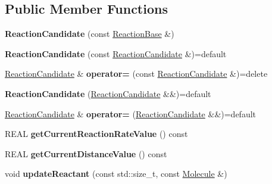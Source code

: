 \subsection*{Public Member Functions}
\begin{DoxyCompactItemize}
\item 
\mbox{\label{classReactionCandidate_a354fb7dab7c9d6f8587a461af02a7cab}} 
{\bfseries Reaction\+Candidate} (const \mbox{\hyperlink{classReactionBase}{Reaction\+Base}} \&)
\item 
\mbox{\label{classReactionCandidate_ab8ef2e26cd357558bc3f1da8678fa287}} 
{\bfseries Reaction\+Candidate} (const \mbox{\hyperlink{classReactionCandidate}{Reaction\+Candidate}} \&)=default
\item 
\mbox{\label{classReactionCandidate_aa09fe4ee2be07ed048558923200d0d6b}} 
\mbox{\hyperlink{classReactionCandidate}{Reaction\+Candidate}} \& {\bfseries operator=} (const \mbox{\hyperlink{classReactionCandidate}{Reaction\+Candidate}} \&)=delete
\item 
\mbox{\label{classReactionCandidate_aaa9808f8a1e2317a8ecafdba3595754c}} 
{\bfseries Reaction\+Candidate} (\mbox{\hyperlink{classReactionCandidate}{Reaction\+Candidate}} \&\&)=default
\item 
\mbox{\label{classReactionCandidate_afc2a6b341b33532357d3fe6cf377b603}} 
\mbox{\hyperlink{classReactionCandidate}{Reaction\+Candidate}} \& {\bfseries operator=} (\mbox{\hyperlink{classReactionCandidate}{Reaction\+Candidate}} \&\&)=default
\item 
\mbox{\label{classReactionCandidate_a62a059b5040f22b857dfeb267bb91d6a}} 
R\+E\+AL {\bfseries get\+Current\+Reaction\+Rate\+Value} () const
\item 
\mbox{\label{classReactionCandidate_a6b563ebd5094f392d1f777673c004a63}} 
R\+E\+AL {\bfseries get\+Current\+Distance\+Value} () const
\item 
\mbox{\label{classReactionCandidate_a42331f76746fbad22cd1059078d8214d}} 
void {\bfseries update\+Reactant} (const std\+::size\+\_\+t, const \mbox{\hyperlink{classMolecule}{Molecule}} \&)

\end{DoxyCompactItemize}
